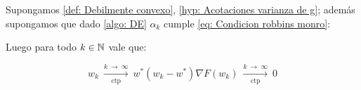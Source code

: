 \begin{theorem}
	\label{theorem: DE en debilmente convexo y alfa decreciente converge ctp}
	Supongamos \ref{def: Debilmente convexo}, \ref{hyp: Acotaciones varianza de g}; adem\'as supongamos que dado \ref{algo: DE} $\alpha_k$ cumple \ref{eq: Condicion robbins monro}:
	
	Luego para todo $k \in {\mathbb{N}}$ vale que:
	
	\begin{subequations}
		\begin{equation}
			w_k \ \xrightarrow[\text{ctp}]{k \ \rightarrow \ \infty } \ w^*
		\end{equation}
		\begin{equation}
			\left(w_k - w^*\right) \nabla F(w_k) \ \xrightarrow[\text{ctp}]{k \ \rightarrow \ \infty } \ 0
		\end{equation}
	\end{subequations}
	
\end{theorem}

